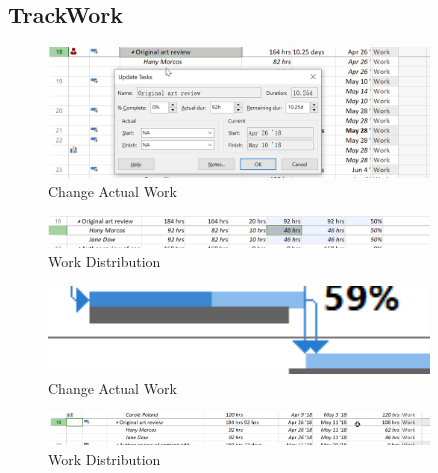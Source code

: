 \documentclass[runningheads]{llncs}
\begin{document}
\subsection*{TrackWork}
\begin{figure}[H]
    \centering
    \includegraphics[width=0.9\textwidth]{./image/t5f1}
    \caption{Change Actual Work}
\end{figure}
\begin{figure}[H]
    \centering
    \includegraphics[width=0.9\textwidth]{./image/t5f2}
    \caption{Work Distribution}
\end{figure}
\begin{figure}[H]
    \centering
    \includegraphics[width=0.9\textwidth]{./image/t5f3}
    \caption{Change Actual Work}
\end{figure}
\begin{figure}[H]
    \centering
    \includegraphics[width=0.9\textwidth]{./image/t5f4}
    \caption{Work Distribution}
\end{figure}
\end{document}
